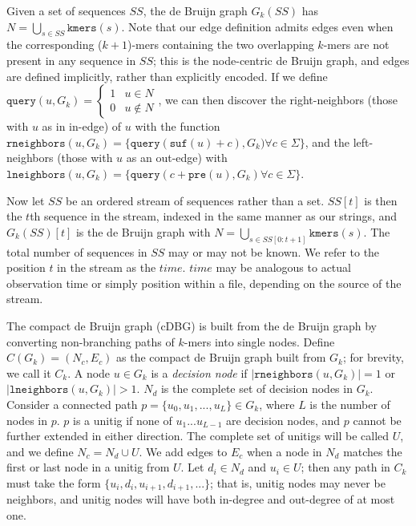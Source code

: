 \documentclass[preprint,number,12pt]{elsarticle}
\begin{document}
Given a set of sequences $SS$, the de Bruijn graph $G_k(SS)$  has $N = \bigcup_{s \in SS}{\texttt{kmers}(s)}$.
Note that our edge definition admits edges even when the corresponding ($k+1$)-mers containing the two overlapping $k$-mers are not present in any sequence in $SS$; this is the node-centric de Bruijn graph, and edges are defined implicitly, rather than explicitly encoded.
If we define $\texttt{query}(u, G_k) = \begin{cases} 1 & u \in N \\0 & u \notin N \end{cases}$, we can then discover the right-neighbors (those with $u$ as in in-edge) of $u$ with the function $\texttt{rneighbors}(u, G_k) = \{\texttt{query}(\texttt{suf}(u) + c), G_k) \forall c \in \Sigma\}$, and the left-neighbors (those with $u$ as an out-edge) with $\texttt{lneighbors}(u, G_k) = \{\texttt{query}(c + \texttt{pre}(u), G_k) \forall c \in \Sigma\}$.

Now let $SS$ be an ordered stream of sequences rather than a set. $SS[t]$ is then the $t$th sequence in the stream, indexed in the same manner as our strings, and $G_k(SS)[t]$ is the de Bruijn graph with $N = \bigcup_{s \in SS[0:t+1]}{\texttt{kmers}(s)}$.
The total number of sequences in $SS$ may or may not be known. We refer to the position $t$ in the stream as the $time$.
$time$ may be analogous to actual observation time or simply position within a file, depending on the source of the stream.

The compact de Bruijn graph (cDBG) is built from the  de Bruijn graph by converting non-branching paths of $k$-mers into single nodes.
Define $C(G_k) = (N_c, E_c)$ as the compact de Bruijn graph built from $G_k$; for brevity, we call it $C_k$.
A node $u \in G_k$ is a \textit{decision node} if $|\texttt{rneighbors}(u, G_k)| = 1$ or $|\texttt{lneighbors}(u, G_k)| > 1$.
$N_d$ is the complete set of decision nodes in $G_k$.
Consider a connected path $p = \{u_0, u_1, ... , u_L\} \in G_k$, where $L$ is the number of nodes in $p$. $p$ is a unitig if none of $u_1 ... u_{L-1}$ are decision nodes, and $p$ cannot be further extended in either direction.
The complete set of unitigs will be called $U$, and we define $N_c = N_d \cup U$.
We add edges to $E_c$ when a node in $N_d$ matches the first or last node in a unitig from $U$. Let $d_i \in N_d$ and $u_i \in U$; then any path in $C_k$ must take the form $\{u_i, d_i, u_{i+1}, d_{i+1}, ...\}$; that is, unitig nodes may never be neighbors, and unitig nodes will have both in-degree and out-degree of at most one.
\end{document}
